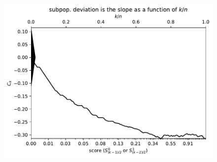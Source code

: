 \documentclass{article}
\newlength{\vertsep}
\newlength{\imsize}
\begin{document}
\begin{figure}
\begin{centering}

\parbox{\imsize}{\includegraphics[width=\imsize]
{../codes/unweighted/nll-1-60-night-snake-Hypsiglena-torquata_323-monarch-monarch-butterfly-milkweed-butterfly-Danaus-plexippus.pdf}}

\vspace{\vertsep}


\end{centering}
\end{figure}
\end{document}
